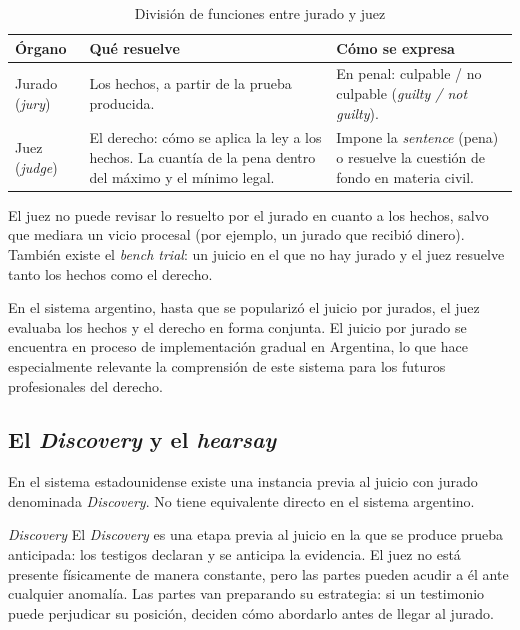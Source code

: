 \documentclass[12pt,oneside]{book}
\begin{document}
\begin{table}[H]
\centering
\caption{División de funciones entre jurado y juez}
\begin{tabularx}{\textwidth}{>{\raggedright\arraybackslash}p{} >{\raggedright\arraybackslash}X >{\raggedright\arraybackslash}X}
\toprule
\textbf{Órgano} & \textbf{Qué resuelve} & \textbf{Cómo se expresa} \\
\midrule
Jurado (\textit{jury}) & Los hechos, a partir de la prueba producida. & En penal: culpable / no culpable (\textit{guilty / not guilty}). \\
Juez (\textit{judge}) & El derecho: cómo se aplica la ley a los hechos. La cuantía de la pena dentro del máximo y el mínimo legal. & Impone la \textit{sentence} (pena) o resuelve la cuestión de fondo en materia civil. \\
\bottomrule
\end{tabularx}
\end{table}

El juez no puede revisar lo resuelto por el jurado en cuanto a los hechos, salvo que mediara un vicio procesal (por ejemplo, un jurado que recibió dinero). También existe el \textit{bench trial}: un juicio en el que no hay jurado y el juez resuelve tanto los hechos como el derecho.

\begin{note}
En el sistema argentino, hasta que se popularizó el juicio por jurados, el juez evaluaba los hechos y el derecho en forma conjunta. El juicio por jurado se encuentra en proceso de implementación gradual en Argentina, lo que hace especialmente relevante la comprensión de este sistema para los futuros profesionales del derecho.
\end{note}

\subsection{El \textit{Discovery} y el \textit{hearsay}}

En el sistema estadounidense existe una instancia previa al juicio con jurado denominada \textit{Discovery}. No tiene equivalente directo en el sistema argentino.

\begin{definition}{\textit{Discovery}}
El \textit{Discovery} es una etapa previa al juicio en la que se produce prueba anticipada: los testigos declaran y se anticipa la evidencia. El juez no está presente físicamente de manera constante, pero las partes pueden acudir a él ante cualquier anomalía. Las partes van preparando su estrategia: si un testimonio puede perjudicar su posición, deciden cómo abordarlo antes de llegar al jurado.
\end{definition}
\end{document}
